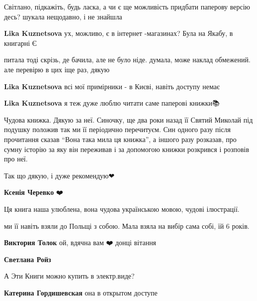 
Світлано, підкажіть, будь ласка, а чи є ще можливість придбати паперову версію
десь? шукала нещодавно, і не знайшла

\begin{itemize} %
\textbf{Lika Kuznetsova} ух, можливо, є в інтернет -магазинах? Була на Якабу, в книгарні Є


питала тоді скрізь, де бачила, але не було ніде. думала, може наклад обмежений.
але перевірю в цих іще раз, дякую

\textbf{Lika Kuznetsova} всі мої примірники - в Києві, навіть доступу немає

\textbf{Lika Kuznetsova} я теж дуже люблю читати саме паперові книжки📚
\end{itemize} %


Чудова книжка. Дякую за неї. Синочку, ще два роки назад її Святий Миколай під
подушку положив так ми її періодично перечитуєм. Син одного разу після
прочитання сказав \enquote{Вона така мила ця книжка}, а іншого разу розказав, про
сумну історію за яку він переживав і за допомогою книжки розкрився і розповів
про неї.

Так що дякую, і дуже рекомендую❤

\begin{itemize} %
\textbf{Ксенія Черевко} ❤️
\end{itemize} %


Ця книга наша улюблена, вона чудова українською мовою, чудові ілюстрації.

\begin{itemize} %

ми її навіть взяли до Польщі з собою. Мала взяла на вибір сама собі, їй 6 років.

\textbf{Виктория Толок} ой, вдячна вам ❤️ донці вітання
\end{itemize} %

\textbf{Светлана Ройз}

А Эти Книги можно купить в электр.виде?

\begin{itemize} %
\textbf{Катерина Гордишевская} она в открытом доступе
\end{itemize} %

